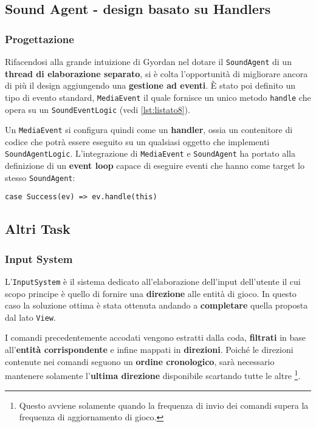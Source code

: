 \subsection{Sound Agent - design basato su Handlers}
\label{subsec:media_event}
\subsubsection{Progettazione}
Rifacendosi alla grande intuizione di Gyordan nel dotare il \texttt{SoundAgent} di un \textbf{thread di elaborazione separato}, si è colta l'opportunità di migliorare ancora di più il design aggiungendo una \textbf{gestione ad eventi}. È stato poi definito un tipo di evento standard, \texttt{MediaEvent} il quale fornisce un unico metodo \texttt{handle} che opera su un \texttt{SoundEventLogic} (vedi \ref{lst:listato8}).



Un \texttt{MediaEvent} si configura quindi come un \textbf{handler}, ossia un contenitore di codice che potrà essere eseguito su un qualsiasi oggetto che implementi \texttt{SoundAgentLogic}. L'integrazione di \texttt{MediaEvent} e \texttt{SoundAgent} ha portato alla definizione di un \textbf{event loop} capace di eseguire eventi che hanno come target lo stesso \texttt{SoundAgent}:
\begin{verbatim}
case Success(ev) => ev.handle(this)
\end{verbatim}

\subsection{Altri Task}
\subsubsection{Input System}
\label{subsubsec:input_sys}
L'\texttt{InputSystem} è il sistema dedicato all'elaborazione dell'input dell'utente il cui scopo principe è quello di fornire una \textbf{direzione} alle entità di gioco. In questo caso la soluzione ottima è stata ottenuta andando a \textbf{completare} quella proposta dal lato \texttt{View}.

I comandi precedentemente accodati vengono estratti dalla coda, \textbf{filtrati} in base all'\textbf{entità corrispondente} e infine mappati in \textbf{direzioni}. Poiché le direzioni contenute nei comandi seguono un \textbf{ordine cronologico}, sarà necessario mantenere solamente l'\textbf{ultima direzione} disponibile scartando tutte le altre \footnote{Questo avviene solamente quando la frequenza di invio dei comandi supera la frequenza di aggiornamento di gioco.}.

